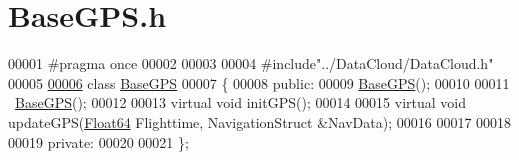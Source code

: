 \hypertarget{_base_g_p_s_8h_source}{}\section{Base\+G\+P\+S.\+h}
\label{_base_g_p_s_8h_source}

\begin{DoxyCode}
00001 \textcolor{preprocessor}{#pragma once}
00002 
00003 
00004 \textcolor{preprocessor}{#include"../DataCloud/DataCloud.h"}
00005 
\hyperlink{class_base_g_p_s}{00006} \textcolor{keyword}{class }\hyperlink{class_base_g_p_s}{BaseGPS}
00007 \{
00008 \textcolor{keyword}{public}:
00009     \hyperlink{class_base_g_p_s}{BaseGPS}();
00010 
00011     ~\hyperlink{class_base_g_p_s}{BaseGPS}();
00012 
00013     \textcolor{keyword}{virtual} \textcolor{keywordtype}{void} initGPS();
00014 
00015     \textcolor{keyword}{virtual} \textcolor{keywordtype}{void} updateGPS(\hyperlink{group___tools_ga3f1431cb9f76da10f59246d1d743dc2c}{Float64} Flighttime, NavigationStruct &NavData);
00016 
00017 
00018 
00019 \textcolor{keyword}{private}:
00020 
00021 \};
\end{DoxyCode}
